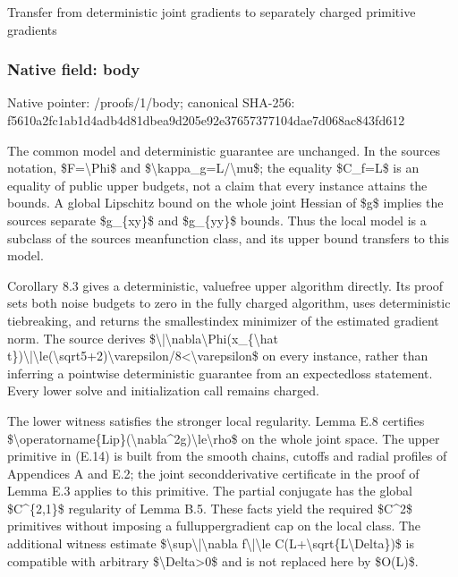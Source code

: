 \documentclass[10pt,a4paper]{article}
\begin{document}
Transfer from deterministic joint gradients to separately charged primitive gradients


\subsubsection{Native field: body}


Native pointer: /proofs/1/body; canonical SHA-256: f5610a2fc1ab1d4adb4d81db\allowbreak{}ea9d205e92e37657377104da\allowbreak{}e7d068ac843fd612


The common model and deterministic guarantee are unchanged. In the sources notation, \$F=\textbackslash{}Phi\$ and \$\textbackslash{}kappa\_g=L/\textbackslash{}mu\$; the equality \$C\_f=L\$ is an equality of public upper budgets, not a claim that every instance attains the bounds. A global Lipschitz bound on the whole joint Hessian of \$g\$ implies the sources separate \$g\_\{xy\}\$ and \$g\_\{yy\}\$ bounds. Thus the local model is a subclass of the sources meanfunction class, and its upper bound transfers to this model.

Corollary 8.3 gives a deterministic, valuefree upper algorithm directly. Its proof sets both noise budgets to zero in the fully charged algorithm, uses deterministic tiebreaking, and returns the smallestindex minimizer of the estimated gradient norm. The source derives \$\textbackslash{}|\textbackslash{}nabla\textbackslash{}Phi(x\_\{\textbackslash{}hat t\})\textbackslash{}|\textbackslash{}le(\textbackslash{}sqrt5+2)\textbackslash{}varep\allowbreak{}silon/8<\textbackslash{}varepsilon\$ on every instance, rather than inferring a pointwise deterministic guarantee from an expectedloss statement. Every lower solve and initialization call remains charged.

The lower witness satisfies the stronger local regularity. Lemma E.8 certifies \$\textbackslash{}operatorname\{Lip\}(\textbackslash{}nabla\textasciicircum{}2g)\textbackslash{}le\textbackslash{}rho\$ on the whole joint space. The upper primitive in (E.14) is built from the smooth chains, cutoffs and radial profiles of Appendices A and E.2; the joint secondderivative certificate in the proof of Lemma E.3 applies to this primitive. The partial conjugate has the global \$C\textasciicircum{}\{2,1\}\$ regularity of Lemma B.5. These facts yield the required \$C\textasciicircum{}2\$ primitives without imposing a fulluppergradient cap on the local class. The additional witness estimate \$\textbackslash{}sup\textbackslash{}|\textbackslash{}nabla f\textbackslash{}|\textbackslash{}le C(L+\textbackslash{}sqrt\{L\textbackslash{}Delta\})\$ is compatible with arbitrary \$\textbackslash{}Delta>0\$ and is not replaced here by \$O(L)\$.
\end{document}
